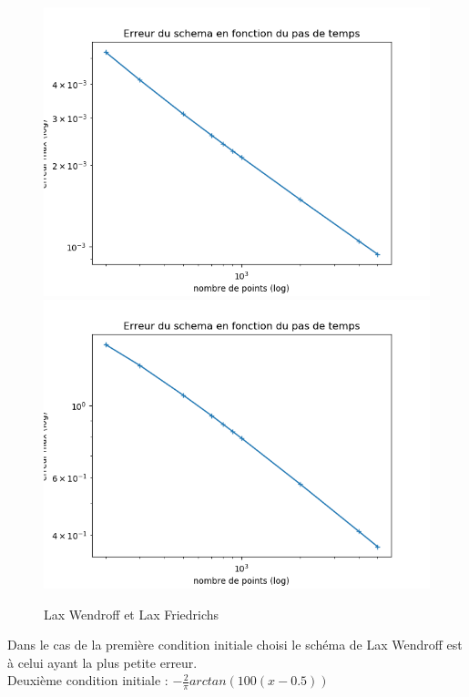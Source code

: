 \documentclass[12pt]{article}
\begin{document}
\begin{figure}[H]
	\centering
	\includegraphics[scale=0.40]{erreur_schema3_init1.png}
	\includegraphics[scale=0.40]{erreur_schema5_init1.png}
	\caption{Lax Wendroff et Lax Friedrichs}
	\label{1D}
	\end{figure}
Dans le cas de la première condition initiale choisi le schéma de Lax Wendroff est à celui ayant la plus petite erreur. 
\\Deuxième condition initiale : $-\frac{2}{\pi}arctan(100(x-0.5))$
\end{document}
